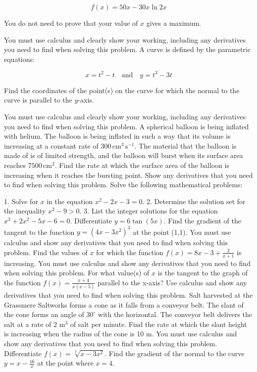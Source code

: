 \documentclass[12pt,addpoints]{exam}
\begin{document}
\begin{questions}
\[ f(x) = 50x - 30x \ln 2x \]

You do not need to prove that your value of \( x \) gives a maximum.

You must use calculus and clearly show your working, including any derivatives you need to find when solving this problem.
\fillwithlines{5cm}
\question[5] A curve is defined by the parametric equations:

\[ x = t^2 - t \quad \text{and} \quad y = t^3 - 3t \]

Find the coordinates of the point(s) on the curve for which the normal to the curve is parallel to the \( y \)-axis.

You must use calculus and clearly show your working, including any derivatives you need to find when solving this problem.
\fillwithlines{5cm}
\question[5] A spherical balloon is being inflated with helium. The balloon is being inflated in such a way that its volume is increasing at a constant rate of \(300 \, \text{cm}^3 \, \text{s}^{-1}\). The material that the balloon is made of is of limited strength, and the balloon will burst when its surface area reaches \(7500 \, \text{cm}^2\). Find the rate at which the surface area of the balloon is increasing when it reaches the bursting point. Show any derivatives that you need to find when solving this problem.
\fillwithlines{5cm}
\question[5] Solve the following mathematical problems:

1. Solve for \(x\) in the equation \(x^2 - 2x - 3 = 0\).
2. Determine the solution set for the inequality \(x^2 - 9 > 0\).
3. List the integer solutions for the equation \(x^3 + 2x^2 - 5x - 6 = 0\).
\fillwithlines{5cm}
\question[5] Differentiate \( y = 6 \tan(5x) \).
\fillwithlines{5cm}
\question[5] Find the gradient of the tangent to the function \( y = (4x - 3x^2)^3 \) at the point (1,1). You must use calculus and show any derivatives that you need to find when solving this problem.
\fillwithlines{5cm}
\question[5] Find the values of \( x \) for which the function \( f(x) = 8x - 3 + \frac{2}{x+1} \) is increasing. You must use calculus and show any derivatives that you need to find when solving this problem.
\fillwithlines{5cm}
\question[5] For what value(s) of \( x \) is the tangent to the graph of the function \( f(x) = \frac{x+4}{x(x-5)} \) parallel to the x-axis? Use calculus and show any derivatives that you need to find when solving this problem.
\fillwithlines{5cm}
\question[5] Salt harvested at the Grassmere Saltworks forms a cone as it falls from a conveyor belt. The slant of the cone forms an angle of \(30^\circ\) with the horizontal. The conveyor belt delivers the salt at a rate of 2 m\(^3\) of salt per minute. Find the rate at which the slant height is increasing when the radius of the cone is 10 m. You must use calculus and show any derivatives that you need to find when solving this problem.
\fillwithlines{5cm}
\question[5] Differentiate \( f(x) = \sqrt[3]{x - 3x^2} \).
\fillwithlines{5cm}
\question[5] Find the gradient of the normal to the curve \( y = x - \frac{16}{x} \) at the point where \( x = 4 \).


\end{questions}
\end{document}
